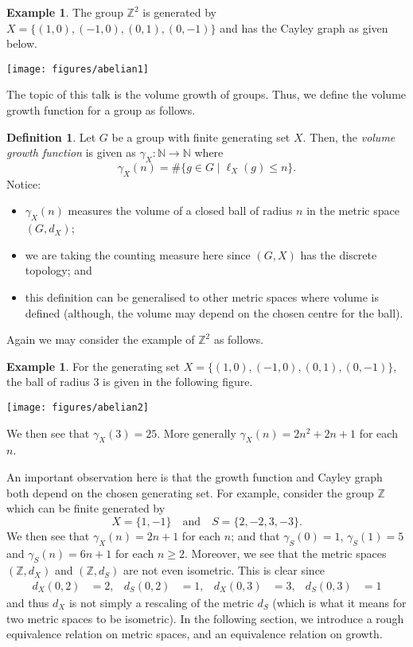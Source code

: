 \documentclass[11pt,a4paper,reqno]{amsart}
\theoremstyle{plain}
\theoremstyle{definition}
\newtheorem{definition}[theorem]{Definition}
\theoremstyle{definition}
\newtheorem{example}[theorem]{Example}
\renewcommand\leq\leqslant
\renewcommand\geq\geqslant
\begin{document}
\begin{example}
	The group $\mathbb{Z}^2$ is generated by $X = \{(1,0),(-1,0),(0,1),(0,-1)\}$ and has the Cayley graph as given below.
	
	\begin{center}
	\texttt{[image: figures/abelian1]}
	\end{center}
\end{example}

The topic of this talk is the volume growth of groups.
Thus, we define the volume growth function for a group as follows.

\begin{definition}
	Let $G$ be a group with finite generating set $X$.
	Then, the \emph{volume growth function} is given as $\gamma_X\colon \mathbb{N}\to \mathbb{N}$ where
	\[
		\gamma_X(n)
		=
		\#\{
			g\in G
		\mid
			\ell_X(g) \leq n
		\}.
	\]
	Notice:
	\begin{itemize}
		\item $\gamma_X(n)$ measures the volume of a closed ball of radius $n$ in the metric space $(G,d_X)$;
		\item we are taking the counting measure here since $(G,X)$ has the discrete topology; and
		\item this definition can be generalised to other metric spaces where volume is defined (although, the volume may depend on the chosen centre for the ball).
	\end{itemize}
\end{definition}

Again we may consider the example of $\mathbb{Z}^2$ as follows.

\begin{example}
	For the generating set
	$
		X = \{(1,0),(-1,0),(0,1),(0,-1)\}
	$,
	the ball of radius $3$ is given in the following figure.
	\begin{center}
		\texttt{[image: figures/abelian2]}
	\end{center}
	We then see that $\gamma_X(3) = 25$.
	More generally $\gamma_X(n) = 2n^2+2n+1$ for each $n$.
\end{example}

An important observation here is that the growth function and Cayley graph both depend on the chosen generating set.
For example, consider the group $\mathbb{Z}$ which can be finite generated by
\[
	X = \{1,-1\}
	\quad\text{and}\quad
	S = \{2,-2,3,-3\}.
\]
We then see that $\gamma_X(n) = 2n+1$ for each $n$; and that $\gamma_S(0)=1$, $\gamma_S(1)=5$ and $\gamma_S(n)=6n+1$ for each $n \geq 2$.
Moreover, we see that the metric spaces $(\mathbb{Z},d_X)$ and $(\mathbb{Z},d_S)$ are not even isometric. This is clear since
\begin{align*}
	d_X(0,2) &= 2, & d_S(0,2)&=1, &
	d_X(0,3) &= 3, & d_S(0,3)&=1
\end{align*}
and thus $d_X$ is not simply a rescaling of the metric $d_S$ (which is what it means for two metric spaces to be isometric).
In the following section, we introduce a rough equivalence relation on metric spaces, and an equivalence relation on growth.
\end{document}
